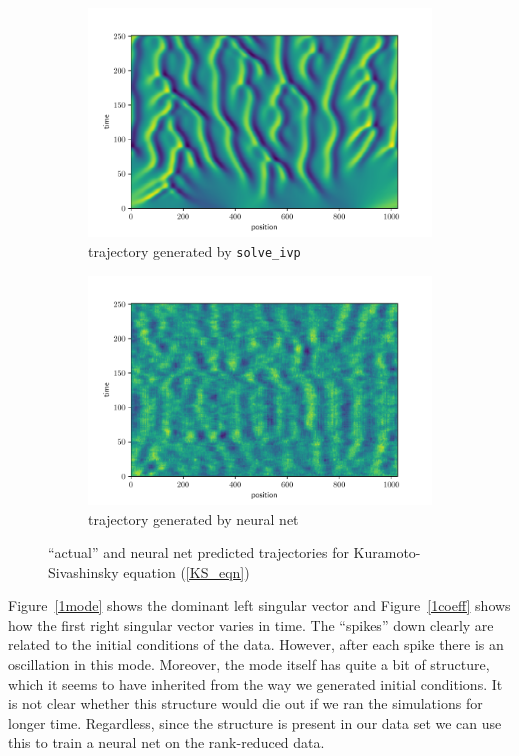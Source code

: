 \documentclass[10pt]{article}
\begin{document}
\begin{figure}[h]\centering
\begin{subfigure}{.45\textwidth}\centering
    \includegraphics[width=\textwidth]{img/sample_KS_trajectory.pdf}
    \caption{trajectory generated by {\tt solve\_ivp}}
    \label{sample_KS_trajectory}
\end{subfigure}\hfill
\begin{subfigure}{.45\textwidth}\centering
    \includegraphics[width=\textwidth]{img/predicted_KS_trajectory.pdf}
    \caption{trajectory generated by neural net}
    \label{predicted_KS_trajectory}
\end{subfigure}
\caption{``actual'' and neural net predicted trajectories for Kuramoto-Sivashinsky equation (\ref{KS_eqn})}
\label{KS_trajectory}
\end{figure}

Figure~\ref{1mode} shows the dominant left singular vector and Figure~\ref{1coeff} shows how the first right singular vector varies in time. The ``spikes'' down clearly are related to the initial conditions of the data. However, after each spike there is an oscillation in this mode. Moreover, the mode itself has quite a bit of structure, which it seems to have inherited from the way we generated initial conditions. It is not clear whether this structure would die out if we ran the simulations for longer time. Regardless, since the structure is present in our data set we can use this to train a neural net on the rank-reduced data.
\end{document}
